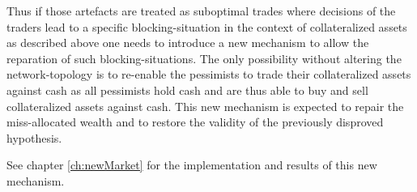 \documentclass[Bachelorarbeit.tex]{subfiles}
\begin{document}
\medskip 

Thus if those artefacts are treated as suboptimal trades where decisions of the traders lead to a specific blocking-situation in the context of collateralized assets as described above one needs to introduce a new mechanism to allow the reparation of such blocking-situations. The only possibility without altering the network-topology is to re-enable the pessimists to trade their collateralized assets against cash as all pessimists hold cash and are thus able to buy and sell collateralized assets against cash. This new mechanism is expected to repair the miss-allocated wealth and to restore the validity of the previously disproved hypothesis.

\medskip 

See chapter \ref{ch:newMarket} for the implementation and results of this new mechanism.
\end{document}
